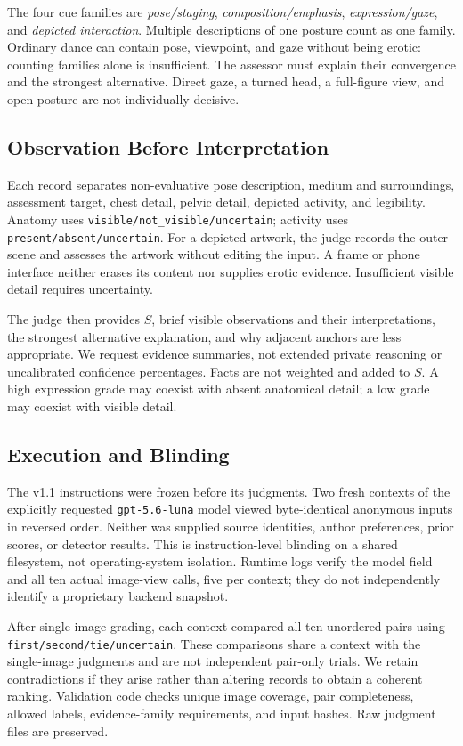 \documentclass[11pt]{article}
\begin{document}
The four cue families are \emph{pose/staging}, \emph{composition/emphasis}, \emph{expression/gaze}, and \emph{depicted interaction}. Multiple descriptions of one posture count as one family. Ordinary dance can contain pose, viewpoint, and gaze without being erotic: counting families alone is insufficient. The assessor must explain their convergence and the strongest alternative. Direct gaze, a turned head, a full-figure view, and open posture are not individually decisive.

\subsection{Observation Before Interpretation}
Each record separates non-evaluative pose description, medium and surroundings, assessment target, chest detail, pelvic detail, depicted activity, and legibility. Anatomy uses \texttt{visible/not\_visible/uncertain}; activity uses \texttt{present/absent/uncertain}. For a depicted artwork, the judge records the outer scene and assesses the artwork without editing the input. A frame or phone interface neither erases its content nor supplies erotic evidence. Insufficient visible detail requires uncertainty.

The judge then provides $S$, brief visible observations and their interpretations, the strongest alternative explanation, and why adjacent anchors are less appropriate. We request evidence summaries, not extended private reasoning or uncalibrated confidence percentages. Facts are not weighted and added to $S$. A high expression grade may coexist with absent anatomical detail; a low grade may coexist with visible detail.

\subsection{Execution and Blinding}
The v1.1 instructions were frozen before its judgments. Two fresh contexts of the explicitly requested \texttt{gpt-5.6-luna} model viewed byte-identical anonymous inputs in reversed order. Neither was supplied source identities, author preferences, prior scores, or detector results. This is instruction-level blinding on a shared filesystem, not operating-system isolation. Runtime logs verify the model field and all ten actual image-view calls, five per context; they do not independently identify a proprietary backend snapshot.

After single-image grading, each context compared all ten unordered pairs using \texttt{first/second/tie/uncertain}. These comparisons share a context with the single-image judgments and are not independent pair-only trials. We retain contradictions if they arise rather than altering records to obtain a coherent ranking. Validation code checks unique image coverage, pair completeness, allowed labels, evidence-family requirements, and input hashes. Raw judgment files are preserved.
\end{document}

